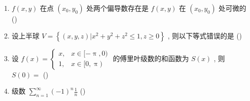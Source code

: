 \begin{enumerate}
	\item $f(x,y)$ 在点 $(x_0,y_0)$ 处两个偏导数存在是 $f(x,y)$ 在 $(x_0,y_0)$ 处可微的 (\hspace{1pc})
	
	\item 设上半球 $V=\left\{(x, y, z) | x^{2}+y^{2}+z^{2} \leq 1, z \geq 0\right\}$ , 则以下等式错误的是 (\hspace{1pc})
	
	\item 设 $f(x)=\begin{cases}
	x, & x\in[-\uppi,0)\\
	1, & x\in[0,\uppi)
	\end{cases}$ 的傅里叶级数的和函数为 $S(x)$ , 则 $S(0)=$ (\hspace{1pc})
	
	\item 级数 $\sum_{n=1}^{\infty}(-1)^{n} \frac{1}{n}$ (\hspace{1pc})
\end{enumerate}

